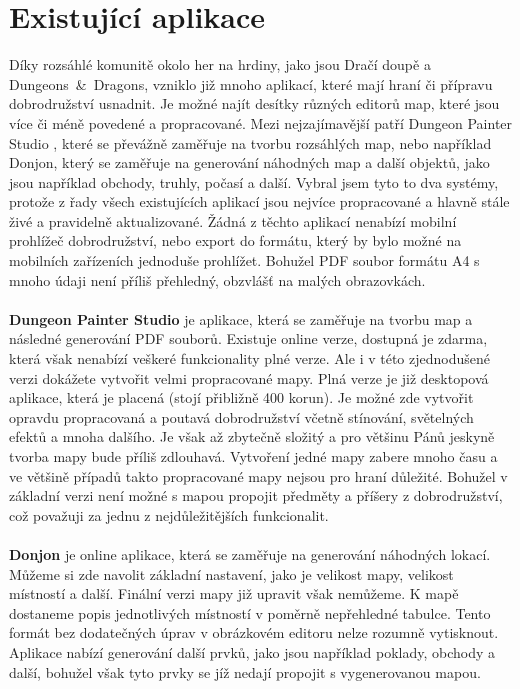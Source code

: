 \documentclass[thesis=B,czech]{resources/FITthesis}[2012/06/26]
\begin{document}
	\section{Existující aplikace}
Díky rozsáhlé komunitě okolo her na hrdiny, jako jsou Dračí doupě a Dungeons~\&~Dragons, vzniklo již mnoho aplikací, které mají hraní či přípravu dobrodružství usnadnit. Je možné najít desítky různých editorů map, které jsou více či méně povedené a propracované. Mezi nejzajímavější patří  Dungeon Painter Studio \cite{dungeoPainterStudio}, které se převážně zaměřuje na tvorbu rozsáhlých map, nebo například Donjon\cite{donjon}, který se zaměřuje na generování náhodných map a další objektů, jako jsou například obchody, truhly, počasí a další. Vybral jsem tyto to dva systémy, protože z řady všech existujících aplikací jsou nejvíce propracované a hlavně stále živé a pravidelně aktualizované. Žádná z těchto aplikací nenabízí mobilní prohlížeč dobrodružství, nebo export do formátu, který by bylo možné na mobilních zařízeních jednoduše prohlížet. Bohužel PDF soubor formátu A4 s mnoho údaji není příliš přehledný, obzvlášť na malých obrazovkách. \\
\\
\textbf{Dungeon Painter Studio} je aplikace, která se zaměřuje na tvorbu map a následné generování PDF souborů. Existuje online verze, dostupná je zdarma, která však nenabízí veškeré funkcionality plné verze. Ale i v této zjednodušené verzi dokážete vytvořit velmi propracované mapy. Plná verze je již desktopová aplikace, která je placená (stojí  přibližně 400 korun). Je možné zde vytvořit opravdu propracovaná a poutavá dobrodružství včetně stínování, světelných efektů a mnoha dalšího. Je však až zbytečně složitý a pro většinu Pánů jeskyně tvorba mapy bude příliš zdlouhavá. Vytvoření jedné mapy zabere mnoho času a ve většině případů takto propracované mapy nejsou pro hraní důležité. Bohužel v základní verzi není možné s mapou propojit předměty a příšery z dobrodružství, což považuji za jednu z nejdůležitějších funkcionalit. \\
\\
\textbf{Donjon} je online aplikace, která se zaměřuje na generování náhodných lokací. Můžeme si zde navolit základní nastavení, jako je velikost mapy, velikost místností a další. Finální verzi mapy již upravit však nemůžeme. K mapě dostaneme popis jednotlivých místností v poměrně nepřehledné tabulce. Tento formát bez dodatečných úprav v obrázkovém editoru nelze rozumně vytisknout. Aplikace nabízí generování další prvků, jako jsou například poklady, obchody a další, bohužel však tyto prvky se jíž nedají propojit s vygenerovanou mapou. 
\end{document}
